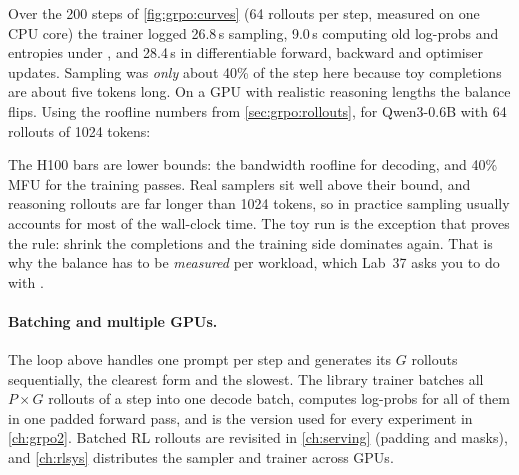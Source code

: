 \begin{systemslens}
Over the 200 steps of \cref{fig:grpo:curves} (64 rollouts per step, measured on one CPU core)
the trainer logged 26.8\,s sampling, 9.0\,s computing old log-probs and entropies under
, and 28.4\,s in differentiable forward, backward and optimiser updates.
Sampling was \emph{only} about 40\% of the step here because toy completions are about five tokens
long. On a GPU with realistic reasoning lengths the balance flips. Using the roofline numbers
from \cref{sec:grpo:rollouts}, for Qwen3-0.6B with 64 rollouts of 1024 tokens:

\smallskip
\centering
{}
\raggedright

\smallskip
The H100 bars are lower bounds: the bandwidth roofline for decoding, and 40\% MFU
for the training passes. Real samplers sit well above their bound, and reasoning
rollouts are far longer than 1024 tokens, so in practice sampling usually accounts for most of
the wall-clock time. The toy run is the exception that proves the rule: shrink the
completions and the training side dominates again. That is why the balance has to be
\emph{measured} per workload, which Lab~37 asks you to do with .
\end{systemslens}

\paragraph{Batching and multiple GPUs.} The loop above handles one prompt per step and
generates its $G$ rollouts sequentially, the clearest form and the slowest. The library trainer
batches all $P\times G$ rollouts of a step into one decode batch, computes log-probs for all
of them in one padded forward pass, and is the version used for every experiment in
\cref{ch:grpo2}. Batched RL rollouts are revisited in \cref{ch:serving} (padding and masks),
and \cref{ch:rlsys} distributes the sampler and trainer across GPUs.


